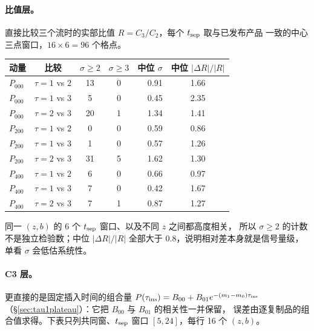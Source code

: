 \documentclass[UTF8,a4paper,11pt]{ctexart}
\begin{document}
\paragraph{比值层。}
直接比较三个流时的实部比值 $R=C_3/C_2$，每个 $t_{\rm sep}$ 取与已发布产品
一致的中心三点窗口，$16\times6=96$ 个格点。

\begin{center}
\footnotesize
\begin{tabular}{@{}lcccrc@{}}
\toprule
动量 & 比较 & $\sigma\ge2$ & $\sigma\ge3$ & 中位 $\sigma$ & 中位 $|\Delta R|/|R|$ \\
\midrule
$P_{000}$ & $\tau=1$ vs $2$ & 13 & 0 & 0.91 & 1.66 \\
$P_{000}$ & $\tau=1$ vs $3$ & 5 & 0 & 0.45 & 2.35 \\
$P_{000}$ & $\tau=2$ vs $3$ & 20 & 1 & 1.34 & 1.41 \\
$P_{200}$ & $\tau=1$ vs $2$ & 0 & 0 & 0.59 & 0.86 \\
$P_{200}$ & $\tau=1$ vs $3$ & 1 & 0 & 0.57 & 1.26 \\
$P_{200}$ & $\tau=2$ vs $3$ & 31 & 5 & 1.62 & 1.30 \\
$P_{400}$ & $\tau=1$ vs $2$ & 6 & 0 & 0.66 & 0.97 \\
$P_{400}$ & $\tau=1$ vs $3$ & 7 & 0 & 0.42 & 1.67 \\
$P_{400}$ & $\tau=2$ vs $3$ & 7 & 1 & 0.87 & 1.27 \\
\bottomrule
\end{tabular}
\end{center}

同一 $(z,b)$ 的 6 个 $t_{\rm sep}$ 窗口、以及不同 $z$ 之间都高度相关，
所以 $\sigma\ge2$ 的计数不是独立检验数；中位 $|\Delta R|/|R|$ 全部大于
$0.8$，说明相对差本身就是信号量级，单看 $\sigma$ 会低估系统性。

\paragraph{C3 层。}
更直接的是固定插入时间的组合量
$P(\tau_{\rm ins})=B_{00}+B_{01}e^{-(m_1-m_0)\tau_{\rm ins}}$
（\S\ref{sec:tau1plateau}）：它把 $B_{00}$ 与 $B_{01}$ 的相关性一并保留，
误差由逐复制品的组合值求得。下表只列共同窗、$t_{\rm sep}$ 窗口
$[5,24]$，每行 16 个 $(z,b)$。
\end{document}
